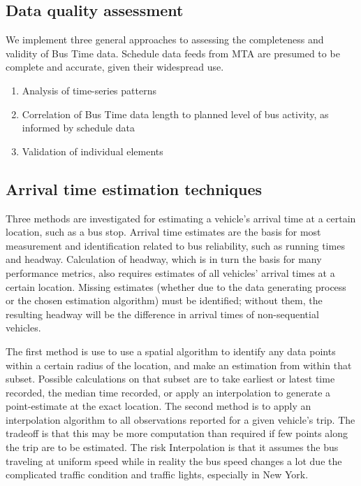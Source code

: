 \documentclass[12pt]{report}
\begin{document}
\subsection{Data quality assessment} 
We implement three general approaches to assessing the completeness and validity of Bus Time data.  Schedule data feeds from MTA are presumed to be complete and accurate, given their widespread use.

\begin{enumerate}
\item Analysis of time-series patterns
\item Correlation of Bus Time data length to planned level of bus activity, as informed by schedule data
\item Validation of individual elements
\end{enumerate}



\subsection{Arrival time estimation techniques}

Three methods are investigated for estimating a vehicle’s arrival time at a certain location, such as a bus stop. Arrival time estimates are the basis for most measurement and identification related to bus reliability, such as running times and headway.  Calculation of headway, which is in turn the basis for many performance metrics, also requires estimates of all vehicles’ arrival times at a certain location. Missing estimates (whether due to the data generating process or the chosen estimation algorithm) must be identified; without them, the resulting headway will be the difference in arrival times of non-sequential vehicles.

The first method is use to use a spatial algorithm to identify any data points within a certain radius of the location, and make an estimation from within that subset. Possible calculations on that subset are to take earliest or latest time recorded, the median time recorded, or apply an interpolation to generate a point-estimate at the exact location. The second method is to apply an interpolation algorithm to all observations reported for a given vehicle’s trip. The tradeoff is that this may be more computation than required if few points along the trip are to be estimated.  The risk Interpolation is that it assumes the bus traveling at uniform speed while in reality the bus speed changes a lot due the complicated traffic condition and traffic lights, especially in New York.
\end{document}
